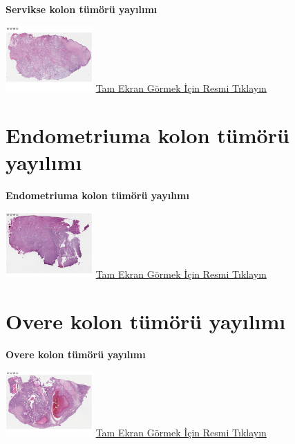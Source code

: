 \documentclass[
  letterpaper,
  DIV=11,
  numbers=noendperiod]{scrreprt}
\begin{document}
\textbf{Servikse kolon tümörü yayılımı}

\href{https://images.patolojiatlasi.com/tumor-spread/HE-cervix.html}{\includegraphics[width=0.25\textwidth,height=\textheight]{./screenshots/tumor-spread-cervix_screenshot.png}}
\href{https://images.patolojiatlasi.com/tumor-spread/HE-cervix.html}{Tam
Ekran Görmek İçin Resmi Tıklayın}

\hypertarget{sec-endometriuma-kolon-tumor-yayilimi}{%
\section{Endometriuma kolon tümörü
yayılımı}\label{sec-endometriuma-kolon-tumor-yayilimi}}

\textbf{Endometriuma kolon tümörü yayılımı}

\href{https://images.patolojiatlasi.com/tumor-spread/HE-endometrium.html}{\includegraphics[width=0.25\textwidth,height=\textheight]{./screenshots/tumor-spread-endometrium_screenshot.png}}
\href{https://images.patolojiatlasi.com/tumor-spread/HE-endometrium.html}{Tam
Ekran Görmek İçin Resmi Tıklayın}

\hypertarget{sec-overe-kolon-tumor-yayilimi}{%
\section{Overe kolon tümörü
yayılımı}\label{sec-overe-kolon-tumor-yayilimi}}

\textbf{Overe kolon tümörü yayılımı}

\href{https://images.patolojiatlasi.com/tumor-spread/HE-over.html}{\includegraphics[width=0.25\textwidth,height=\textheight]{./screenshots/tumor-spread-over_screenshot.png}}
\href{https://images.patolojiatlasi.com/tumor-spread/HE-over.html}{Tam
Ekran Görmek İçin Resmi Tıklayın}
\end{document}
